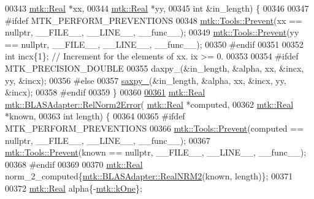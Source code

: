 \begin{DoxyCode}
00343                                      \hyperlink{group__c01-roots_gac080bbbf5cbb5502c9f00405f894857d}{mtk::Real} *xx,
00344                                      \hyperlink{group__c01-roots_gac080bbbf5cbb5502c9f00405f894857d}{mtk::Real} *yy,
00345                                      \textcolor{keywordtype}{int} &in\_length) \{
00346 
00347 \textcolor{preprocessor}{  #ifdef MTK\_PERFORM\_PREVENTIONS}
00348   \hyperlink{classmtk_1_1Tools_a332324c6f25e66be9dff48c5987a3b9f}{mtk::Tools::Prevent}(xx == \textcolor{keyword}{nullptr}, \_\_FILE\_\_, \_\_LINE\_\_, \_\_func\_\_);
00349   \hyperlink{classmtk_1_1Tools_a332324c6f25e66be9dff48c5987a3b9f}{mtk::Tools::Prevent}(yy == \textcolor{keyword}{nullptr}, \_\_FILE\_\_, \_\_LINE\_\_, \_\_func\_\_);
00350 \textcolor{preprocessor}{  #endif}
00351 
00352   \textcolor{keywordtype}{int} incx\{1\};  \textcolor{comment}{// Increment for the elements of xx. ix >= 0.}
00353 
00354 \textcolor{preprocessor}{  #ifdef MTK\_PRECISION\_DOUBLE}
00355   daxpy\_(&in\_length, &alpha, xx, &incx, yy, &incx);
00356 \textcolor{preprocessor}{  #else}
00357   \hyperlink{namespacemtk_a81a2d7d1ea9eff65ae13646c93dad5e9}{saxpy\_}(&in\_length, &alpha, xx, &incx, yy, &incx);
00358 \textcolor{preprocessor}{  #endif}
00359 \}
00360 
\hypertarget{mtk__blas__adapter_8cc_source_l00361}{}\hyperlink{classmtk_1_1BLASAdapter_af2ac5691f45e67d6e26186b071119ec4}{00361} \hyperlink{group__c01-roots_gac080bbbf5cbb5502c9f00405f894857d}{mtk::Real} \hyperlink{classmtk_1_1BLASAdapter_af2ac5691f45e67d6e26186b071119ec4}{mtk::BLASAdapter::RelNorm2Error}(
      \hyperlink{group__c01-roots_gac080bbbf5cbb5502c9f00405f894857d}{mtk::Real} *computed,
00362                                           \hyperlink{group__c01-roots_gac080bbbf5cbb5502c9f00405f894857d}{mtk::Real} *known,
00363                                           \textcolor{keywordtype}{int} length) \{
00364 
00365 \textcolor{preprocessor}{  #ifdef MTK\_PERFORM\_PREVENTIONS}
00366   \hyperlink{classmtk_1_1Tools_a332324c6f25e66be9dff48c5987a3b9f}{mtk::Tools::Prevent}(computed == \textcolor{keyword}{nullptr}, \_\_FILE\_\_, \_\_LINE\_\_, \_\_func\_\_);
00367   \hyperlink{classmtk_1_1Tools_a332324c6f25e66be9dff48c5987a3b9f}{mtk::Tools::Prevent}(known == \textcolor{keyword}{nullptr}, \_\_FILE\_\_, \_\_LINE\_\_, \_\_func\_\_);
00368 \textcolor{preprocessor}{  #endif}
00369 
00370   \hyperlink{group__c01-roots_gac080bbbf5cbb5502c9f00405f894857d}{mtk::Real} norm\_2\_computed\{\hyperlink{classmtk_1_1BLASAdapter_ab92440888b730863244c5d9479c11aca}{mtk::BLASAdapter::RealNRM2}(known, length)\};
00371 
00372   \hyperlink{group__c01-roots_gac080bbbf5cbb5502c9f00405f894857d}{mtk::Real} alpha\{-\hyperlink{group__c01-roots_ga26407c24d43b6b95480943340d285c71}{mtk::kOne}\};

\end{DoxyCode}

